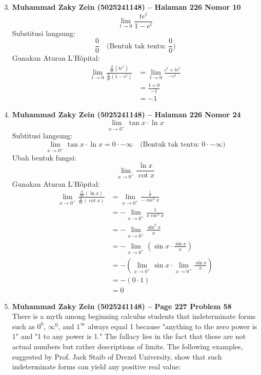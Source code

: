 \documentclass[12pt, letterpaper]{article}
\begin{document}
\begin{enumerate}
    \setcounter{enumi}{2}
    
    \item \textbf{Muhammad Zaky Zein (5025241148) – Halaman 226 Nomor 10}
    \[
    \lim_{t \to 0} \frac{t e^t}{1 - e^t}
    \]
    Substitusi langsung:
    \[
    \frac{0}{0} \quad \text{(Bentuk tak tentu: } \frac{0}{0} \text{)}
    \]
    Gunakan Aturan L’Hôpital:
    \begin{align*}
    \lim_{t \to 0} \frac{\frac{d}{dt}(t e^t)}{\frac{d}{dt}(1 - e^t)} 
    &= \lim_{t \to 0} \frac{e^t + t e^t}{-e^t} \\
    &= \frac{1 + 0}{-1} \\
    &= -1
    \end{align*}

    \item \textbf{Muhammad Zaky Zein (5025241148) – Halaman 226 Nomor 24}
    \[
    \lim_{x \to 0^+} \tan x \cdot \ln x
    \]
    Subtitusi langsung:
    \[
    \lim_{x \to 0^+} \tan x \cdot \ln x = 0 \cdot -\infty \quad \text{(Bentuk tak tentu: } 0 \cdot -\infty \text{)}
    \]
    Ubah bentuk fungsi:
    \[
    \lim_{x \to 0^+} \frac{\ln x}{\cot x}
    \]
    Gunakan Aturan L’Hôpital:
    \begin{align*}
    \lim_{x \to 0^+} \frac{\frac{d}{dx} (\ln x)}{\frac{d}{dx} (\cot x)}
    &=\lim_{x \to 0^+} \frac{\frac{1}{x}}{-\csc^2 x} \\
    &= -\lim_{x \to 0^+} \frac{1}{x \csc^2 x} \\
    &= -\lim_{x \to 0^+} \frac{\sin^2 x}{x} \\
    &= -\lim_{x \to 0^+} \left( \sin x \cdot \frac{\sin x}{x} \right) \\
    &= -\left( \lim_{x \to 0^+} \sin x \cdot \lim_{x \to 0^+} \frac{\sin x}{x} \right) \\
    &= - (0 \cdot 1) \\
    &= 0
    \end{align*}

    \item \textbf{Muhammad Zaky Zein (5025241148) – Page 227 Problem 58} \\
    There is a myth among beginning calculus students that indeterminate forms such as $0^0$, $\infty^0$, and $1^\infty$ always equal 1 because "anything to the zero power is 1" and "1 to any power is 1." The fallacy lies in the fact that these are not actual numbers but rather descriptions of limits. The following examples, suggested by Prof. Jack Staib of Drexel University, show that such indeterminate forms can yield any positive real value:
    

\end{enumerate}
\end{document}
